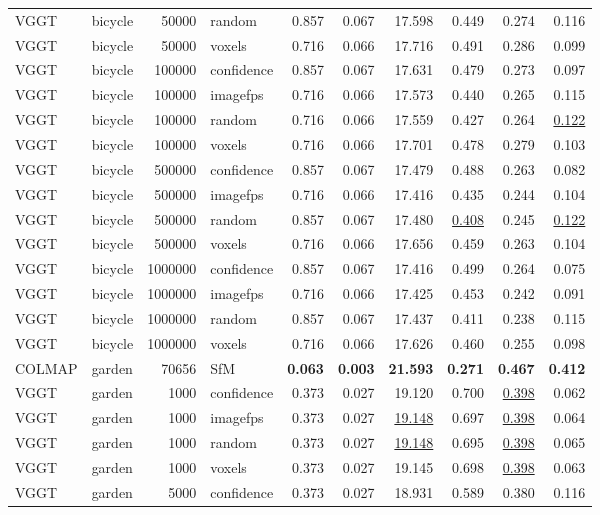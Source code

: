 \begin{table}[H]
\begin{tabular}{llrlrrrrrr}
VGGT & bicycle & 50000 & random & 0.857 & 0.067 & 17.598 & 0.449 & 0.274 & 0.116 \\
VGGT & bicycle & 50000 & voxels & 0.716 & 0.066 & 17.716 & 0.491 & 0.286 & 0.099 \\
VGGT & bicycle & 100000 & confidence & 0.857 & 0.067 & 17.631 & 0.479 & 0.273 & 0.097 \\
VGGT & bicycle & 100000 & imagefps & 0.716 & 0.066 & 17.573 & 0.440 & 0.265 & 0.115 \\
VGGT & bicycle & 100000 & random & 0.716 & 0.066 & 17.559 & 0.427 & 0.264 & \underline{0.122} \\
VGGT & bicycle & 100000 & voxels & 0.716 & 0.066 & 17.701 & 0.478 & 0.279 & 0.103 \\
VGGT & bicycle & 500000 & confidence & 0.857 & 0.067 & 17.479 & 0.488 & 0.263 & 0.082 \\
VGGT & bicycle & 500000 & imagefps & 0.716 & 0.066 & 17.416 & 0.435 & 0.244 & 0.104 \\
VGGT & bicycle & 500000 & random & 0.857 & 0.067 & 17.480 & \underline{0.408} & 0.245 & \underline{0.122} \\
VGGT & bicycle & 500000 & voxels & 0.716 & 0.066 & 17.656 & 0.459 & 0.263 & 0.104 \\
VGGT & bicycle & 1000000 & confidence & 0.857 & 0.067 & 17.416 & 0.499 & 0.264 & 0.075 \\
VGGT & bicycle & 1000000 & imagefps & 0.716 & 0.066 & 17.425 & 0.453 & 0.242 & 0.091 \\
VGGT & bicycle & 1000000 & random & 0.857 & 0.067 & 17.437 & 0.411 & 0.238 & 0.115 \\
VGGT & bicycle & 1000000 & voxels & 0.716 & 0.066 & 17.626 & 0.460 & 0.255 & 0.098 \\
\midrule
COLMAP & garden & 70656 & SfM & \textbf{0.063} & \textbf{0.003} & \textbf{21.593} & \textbf{0.271} & \textbf{0.467} & \textbf{0.412} \\
VGGT & garden & 1000 & confidence & 0.373 & 0.027 & 19.120 & 0.700 & \underline{0.398} & 0.062 \\
VGGT & garden & 1000 & imagefps & 0.373 & 0.027 & \underline{19.148} & 0.697 & \underline{0.398} & 0.064 \\
VGGT & garden & 1000 & random & 0.373 & 0.027 & \underline{19.148} & 0.695 & \underline{0.398} & 0.065 \\
VGGT & garden & 1000 & voxels & 0.373 & 0.027 & 19.145 & 0.698 & \underline{0.398} & 0.063 \\
VGGT & garden & 5000 & confidence & 0.373 & 0.027 & 18.931 & 0.589 & 0.380 & 0.116 \\

\end{tabular}
\end{table}
